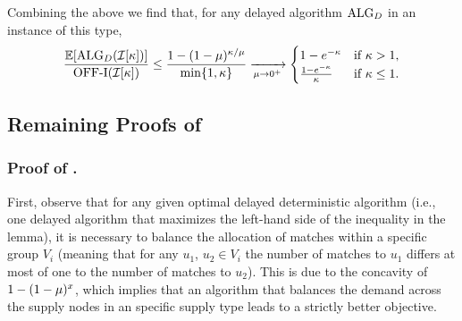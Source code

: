 Combining the above we find that, for any delayed algorithm $\mathrm{ALG}_D$ in an instance of this type,
\begin{equation*}
    \frac{\mathbb E[\mathrm{ALG}_D(\mathcal I[\kappa])]}{\mathrm{\mathrm{OFF}}\textrm{-}\mathrm{I}(\mathcal I[\kappa])} \leq \frac{1-(1-\mu)^{\kappa/\mu}}{\min\{1,\kappa\}} \xrightarrow[\mu \rightarrow 0^+]{} \begin{cases}
        1- e^{-\kappa} & \text{if } \kappa > 1,\\
        \frac{1- e^{-\kappa}}{\kappa} & \text{if } \kappa \leq 1.\\
    \end{cases}
\end{equation*}
\hfill\Halmos %



\subsection{Remaining Proofs of }

\subsubsection[]{Proof of .}
\label{proof: AdvWaterFillingOPT}
First, observe that for any given optimal delayed deterministic algorithm (i.e., one delayed algorithm that maximizes the left-hand side of the inequality in the lemma), it is necessary to balance the allocation of matches within a specific group $V_i$ (meaning that for any $u_1$, $u_2 \in V_i$ the number of matches to $u_1$ differs at most of one to the number of matches to $u_2$). This is due to the concavity of $1-(1-\mu)^x$, which implies that an algorithm that balances the demand across the supply nodes in an specific supply type leads to a strictly better objective.

